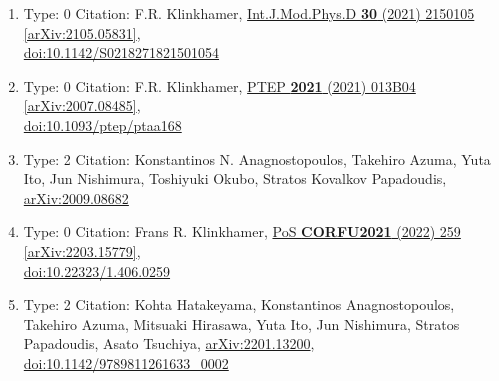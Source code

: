 \documentclass[a4paper,10pt]{article}
\begin{document}
\begin{enumerate}
\begin{enumerate}
  \item Type: 0 Citation: F.R. Klinkhamer, \href{https://www.doi.org/10.1142/S0218271821501054}{Int.J.Mod.Phys.D {\bf 30} (2021) 2150105}  \href{https://arxiv.org/abs/2105.05831}{[arXiv:2105.05831]},\\\href{https://www.doi.org/10.1142/S0218271821501054}{doi:10.1142/S0218271821501054}
  \item Type: 0 Citation: F.R. Klinkhamer, \href{https://www.doi.org/10.1093/ptep/ptaa168}{PTEP {\bf 2021} (2021) 013B04}  \href{https://arxiv.org/abs/2007.08485}{[arXiv:2007.08485]},\\\href{https://www.doi.org/10.1093/ptep/ptaa168}{doi:10.1093/ptep/ptaa168}
  \item Type: 2 Citation: Konstantinos N. Anagnostopoulos, Takehiro Azuma, Yuta Ito, Jun Nishimura, Toshiyuki Okubo, Stratos Kovalkov Papadoudis, \href{https://arxiv.org/abs/2009.08682}{arXiv:2009.08682}
  \item Type: 0 Citation: Frans R. Klinkhamer, \href{https://www.doi.org/10.22323/1.406.0259}{PoS {\bf CORFU2021} (2022) 259}  \href{https://arxiv.org/abs/2203.15779}{[arXiv:2203.15779]},\\\href{https://www.doi.org/10.22323/1.406.0259}{doi:10.22323/1.406.0259}
  \item Type: 2 Citation: Kohta Hatakeyama, Konstantinos Anagnostopoulos, Takehiro Azuma, Mitsuaki Hirasawa, Yuta Ito, Jun Nishimura, Stratos Papadoudis, Asato Tsuchiya, \href{https://arxiv.org/abs/2201.13200}{arXiv:2201.13200},\\\href{https://www.doi.org/10.1142/9789811261633_0002}{doi:10.1142/9789811261633\_0002}

\end{enumerate}
\end{enumerate}
\end{document}
